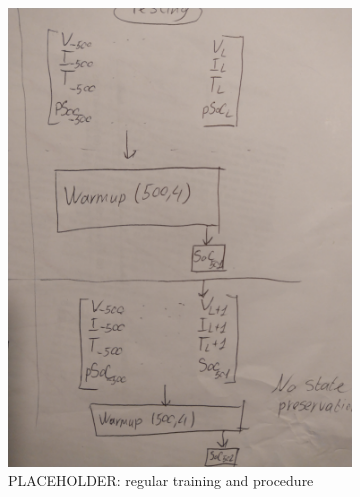 \begin{figure}[htbp]
    \centering
    \begin{subfigure}[b]{0.45\textwidth}
        \centering
        \includegraphics[width=\linewidth]{II_Body/images/IMG_20210524_133103.jpg}
        \caption{PLACEHOLDER: regular training and  procedure}
        \label{subfig:testing}
    \end{subfigure}
    \hfill
    \begin{subfigure}[b]{0.45\textwidth}
        \centering

\end{subfigure}
\end{figure}
